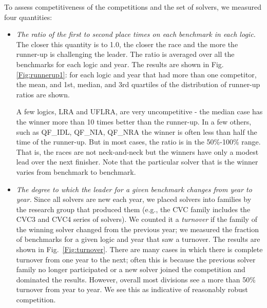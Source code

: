 \documentclass[smallcondensed]{svjour3}
\begin{document}
To assess competitiveness of the competitions and the set of solvers, we measured four quantities:
\begin{itemize}
\item {\em The ratio of the first to second place times on each benchmark in each logic.} The closer this quantity is to 1.0, the closer the race and the more the runner-up is challenging the leader. The ratio is averaged over all the benchmarks for each logic and year. The results are shown in Fig. \ref{Fig:runnerup1}: for each logic and year that had more than one competitor, the mean, and 1st, median, and 3rd quartiles of the distribution of runner-up ratios are shown. 

A few logics, LRA and UFLRA, are very uncompetitive - the median case has the winner more than 10 times better than the runner-up. In a few others, such as QF\_IDL, QF\_NIA, QF\_NRA the winner is often less than half the time of the runner-up. But in most cases, the ratio is in the 50\%-100\% range. That is, the races are not neck-and-neck but the winners have only a modest lead over the next finisher. Note that the particular solver that is the winner varies from benchmark to benchmark.

\item {\em The degree to which the leader for a given benchmark changes from year to year.} Since all solvers are new each year, we placed solvers into families by the research group that produced them (e.g., the CVC family includes the CVC3 and CVC4 series of solvers). We counted it a {\em turnover} if the family of the winning solver changed from the previous year; we measured the fraction of benchmarks for a given logic and year that saw a turnover. The results are shown in 
Fig.~\ref{Fig:turnover}. There are many cases in which there is complete turnover from one year to the next; often this is because the previous solver family no longer participated or a new solver joined the competition and dominated the results. However, overall most
divisions see a more than 50\% turnover from year to year. We see this as indicative of reasonably robust competition.




\end{itemize}
\end{document}
